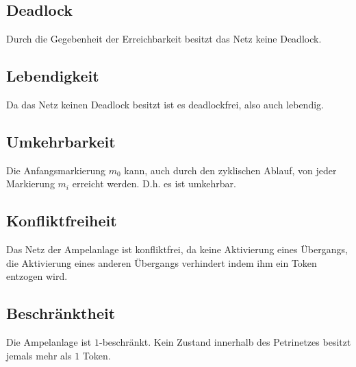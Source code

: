 \documentclass{article}
\begin{document}
		\subsection*{Deadlock}
			Durch die Gegebenheit der Erreichbarkeit besitzt das Netz keine Deadlock.
		\subsection*{Lebendigkeit}
			Da das Netz keinen Deadlock besitzt ist es deadlockfrei, also auch lebendig.
		\subsection*{Umkehrbarkeit}
			Die Anfangsmarkierung $m_0$ kann, auch durch den zyklischen Ablauf, von jeder Markierung $m_i$ erreicht werden. D.h. es ist umkehrbar.
		\subsection*{Konfliktfreiheit}
			Das Netz der Ampelanlage ist konfliktfrei, da keine Aktivierung eines Übergangs, die Aktivierung eines anderen Übergangs verhindert indem ihm ein Token entzogen wird.
		\subsection*{Beschränktheit}
			Die Ampelanlage ist $1$-beschränkt. Kein Zustand innerhalb des Petrinetzes besitzt jemals mehr als $1$ Token.
\end{document}
